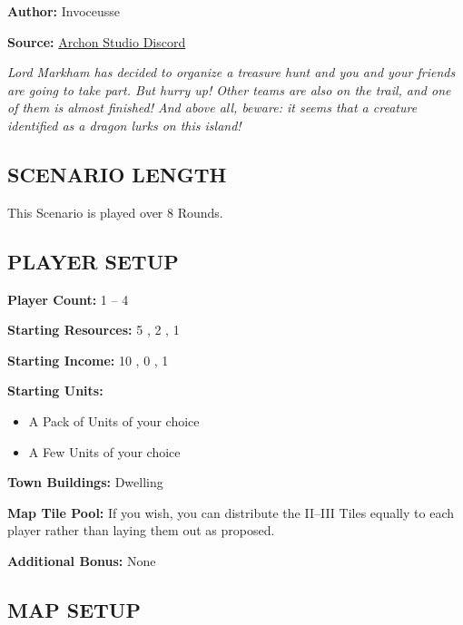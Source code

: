 
\begin{multicols*}{2}

\textbf{Author:} Invoceusse

\textbf{Source:} \href{https://discord.com/channels/740870068178649108/1222679455261261986}{Archon Studio Discord}

\textit{Lord Markham has decided to organize a treasure hunt and you and your friends are going to take part.
  But hurry up! Other teams are also on the trail, and one of them is almost finished!
  And above all, beware: it seems that a creature identified as a dragon lurks on this island!}
\subsection*{\MakeUppercase{Scenario Length}}

This Scenario is played over 8 Rounds.

\subsection*{\MakeUppercase{Player Setup}}

\textbf{Player Count:} 1 -- 4

\textbf{Starting Resources:} 5 , 2 , 1 

\textbf{Starting Income:} 10 , 0 , 1 

\textbf{Starting Units:}
\begin{itemize}
  \item A Pack of  Units of your choice
  \item A Few  Units of your choice
\end{itemize}

\textbf{Town Buildings:}  Dwelling

\textbf{Map Tile Pool:} If you wish, you can distribute the II--III Tiles equally to each player rather than laying them out as proposed.

\textbf{Additional Bonus:} None

\subsection*{\MakeUppercase{Map Setup}}


\end{multicols*}
